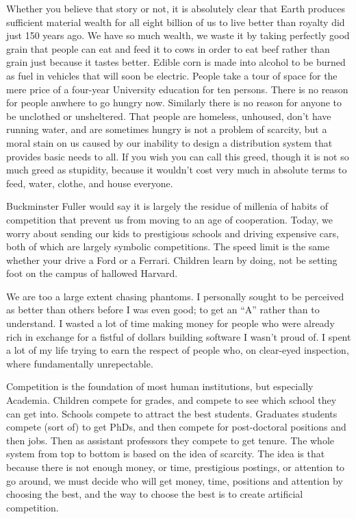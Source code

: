 \documentclass[
	fontsize=10pt, %
	twoside=false, %
	secnumdepth=1, %
]{kaobook}
\begin{document}
Whether you believe that story or not, it is absolutely
clear that Earth produces sufficient material wealth
for all eight billion of us to live better than royalty
did just 150 years ago. We have so much wealth, we
waste it by taking perfectly good grain that people
can eat and feed it to cows in order to eat beef
rather than grain just because it tastes better.
Edible corn is made into alcohol to be burned as fuel
in vehicles that will soon be electric.
People take a tour of space for the mere price
of a four-year University education for ten persons.
There is no reason for people anwhere to go hungry now.
Similarly there is no reason for anyone to be unclothed
or unsheltered. That people are homeless, unhoused,
don't have running water, and are sometimes hungry
is not a problem of scarcity, but a moral stain
on us caused by our inability to design a distribution
system that provides basic needs to all. If you wish
you can call this greed, though it is not
so much greed as stupidity, because
it wouldn't cost very much in absolute terms to feed, water,
clothe, and house everyone.

Buckminster Fuller would say it is largely the residue
of millenia of habits of competition that prevent us
from moving to an age of cooperation.
Today, we worry about sending our kids to prestigious schools
and driving expensive cars, both of which are largely
symbolic competitions. The speed limit is the same
whether your drive a Ford or a Ferrari.
Children learn by doing, not be setting foot on
the campus of hallowed Harvard.

We are too a large extent chasing phantoms.
I personally sought to be perceived as better than others before I was even good;
to get an ``A'' rather than to understand.
I wasted a lot of time making money for people
who were already rich in exchange for a fistful of dollars
building software I wasn't proud of.
I spent a lot of my life trying to earn the respect of
people who, on clear-eyed inspection, where fundamentally
unrepectable.

Competition is the foundation of most human institutions, but especially Academia.
Children compete for grades, and compete to see which school they can get into.
Schools compete to attract the best students. Graduates students compete (sort of)
to get PhDs, and then compete for post-doctoral positions and then jobs. Then
as assistant professors they compete to get tenure.
The whole system from top to bottom is based on the idea of scarcity.
The idea is that because there is not enough money, or time, prestigious postings, or attention to
go around, we must decide who will get money, time, positions and attention by choosing the
best, and the way to choose the best is to create artificial competition.
\end{document}
